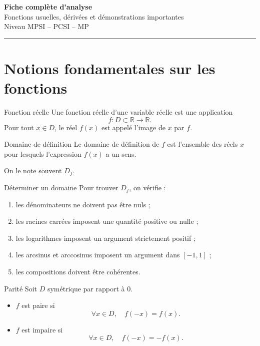 \documentclass[11pt,a4paper]{article}
\newcommand{\R}{\mathbb{R}}
\begin{document}
\begin{center}
    {\Huge \bfseries Fiche complète d'analyse}\\[0.3em]
    {\Large Fonctions usuelles, dérivées et démonstrations importantes}\\[0.4em]
    {\large Niveau MPSI -- PCSI -- MP}\\[0.5em]
    \rule{0.85\linewidth}{0.5pt}
\end{center}

\tableofcontents
\newpage

\section{Notions fondamentales sur les fonctions}

\begin{definitionbox}{Fonction réelle}
Une fonction réelle d'une variable réelle est une application
\[
f : D \subset \R \longrightarrow \R.
\]
Pour tout $x \in D$, le réel $f(x)$ est appelé l'image de $x$ par $f$.
\end{definitionbox}

\begin{definitionbox}{Domaine de définition}
Le domaine de définition de $f$ est l'ensemble des réels $x$ pour lesquels l'expression $f(x)$ a un sens.

On le note souvent $D_f$.
\end{definitionbox}

\begin{methodbox}{Déterminer un domaine}
Pour trouver $D_f$, on vérifie :
\begin{enumerate}[label=\arabic*)]
    \item les dénominateurs ne doivent pas être nuls ;
    \item les racines carrées imposent une quantité positive ou nulle ;
    \item les logarithmes imposent un argument strictement positif ;
    \item les arcsinus et arccosinus imposent un argument dans $[-1,1]$ ;
    \item les compositions doivent être cohérentes.
\end{enumerate}
\end{methodbox}

\begin{definitionbox}{Parité}
Soit $D$ symétrique par rapport à $0$.
\begin{itemize}
    \item $f$ est paire si
    \[
    \forall x\in D,\quad f(-x)=f(x).
    \]
    \item $f$ est impaire si
    \[
    \forall x\in D,\quad f(-x)=-f(x).
    \]
\end{itemize}
\end{definitionbox}
\end{document}
